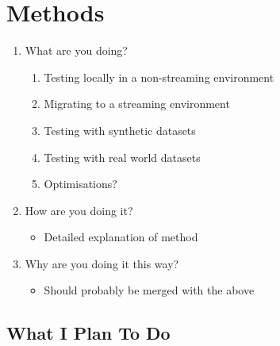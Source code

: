 \section{\wip Methods}

\begin{enumerate}
    \item What are you doing?
    \begin{enumerate}
        \item Testing locally in a non-streaming environment
        \item Migrating to a streaming environment
        \item Testing with synthetic datasets
        \item Testing with real world datasets
        \item Optimisations?
    \end{enumerate}
    \item How are you doing it?
    \begin{itemize}
        \item Detailed explanation of method
    \end{itemize}
    \item Why are you doing it this way?
    \begin{itemize}
        \item Should probably be merged with the above
    \end{itemize}
\end{enumerate}

\subsection{What I Plan To Do}

